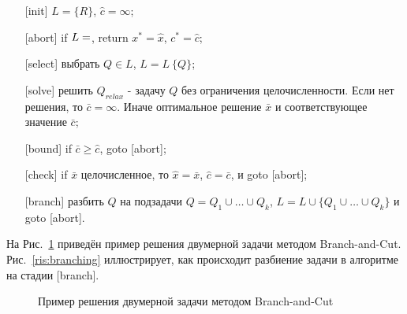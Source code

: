 \documentclass[a4paper,14pt,russian]{extreport}
\begin{document}
\begin{enumerate}
\item[{[init]}]
$L = \{R\}$, $\hat c = \infty$;
\item[{[abort]}]
if $L = \empty$, return $x^*=\hat x$, $c^* = \hat c$;
\item[[{select]}]
выбрать $Q\in L$, $L = L \ \{ Q \}$;
\item[[{solve]}] решить $Q_{relax}$ - задачу $Q$ без ограничения целочисленности. Если нет решения, то $\bar c = \infty$. Иначе оптимальное решение $\bar x$ и соответствующее значение $\bar c$;
\item[{[bound]}] if $\bar c \ge \hat c$, goto [abort];
\item[{[check]}] if $\bar x$ целочисленное, то $\hat x = \bar x$, $\hat c = \bar c$, и goto [abort];
\item[{[branch]}] разбить $Q$ на подзадачи $Q = Q_1 \cup \dots \cup Q_k$, $L = L \cup \{Q_1 \cup \dots \cup Q_k \}$ и goto [abort].
\end{enumerate}
\par 
На Рис.~\ref{ris:example} приведён пример решения двумерной задачи методом Branch-and-Cut. Рис.~\ref{ris:branching} иллюстрирует, как происходит разбиение задачи в алгоритме на стадии [branch].
\par
\begin{figure}[h]
\caption{Пример решения двумерной задачи методом Branch-and-Cut}
\label{ris:example}
\end{figure}
\end{document}
